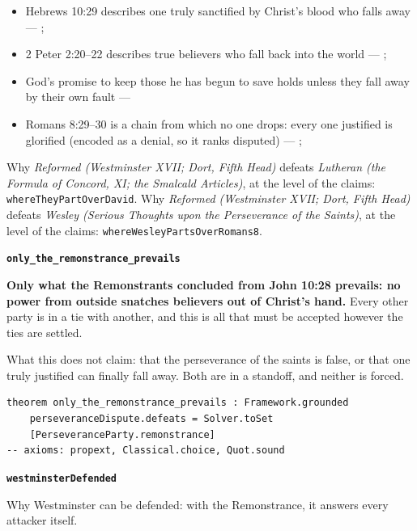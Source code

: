 \documentclass[11pt]{article}
\begin{document}
\begin{itemize}
\begin{itemize}
\item Hebrews 10:29 describes one truly sanctified by Christ’s blood who falls away --- \cite[448--449]{wesley-works-9-1827}; \cite[585]{wesley-explanatory-notes-nt}
\item 2 Peter 2:20–22 describes true believers who fall back into the world --- \cite[445--446]{wesley-works-9-1827}; \cite[625]{wesley-explanatory-notes-nt}
\item God’s promise to keep those he has begun to save holds unless they fall away by their own fault --- \cite[444--445]{wesley-works-9-1827}
\item Romans 8:29–30 is a chain from which no one drops: every one justified is glorified (encoded as a denial, so it ranks disputed) --- \cite[384]{wesley-explanatory-notes-nt}; \cite[413]{wesley-works-9-1827}
\end{itemize}
\end{itemize}
\noindent Why \emph{Reformed (Westminster XVII; Dort, Fifth Head)} defeats \emph{Lutheran (the Formula of Concord, XI; the Smalcald Articles)}, at the level of the claims: \texttt{where\allowbreak{}They\allowbreak{}Part\allowbreak{}Over\allowbreak{}David}.
\noindent Why \emph{Reformed (Westminster XVII; Dort, Fifth Head)} defeats \emph{Wesley (Serious Thoughts upon the Perseverance of the Saints)}, at the level of the claims: \texttt{where\allowbreak{}Wesley\allowbreak{}Parts\allowbreak{}Over\allowbreak{}Romans8}.
\par\medskip\noindent\textbf{\texttt{only\_\allowbreak{}the\_\allowbreak{}remonstrance\_\allowbreak{}prevails}}\par\nobreak\noindent
\textbf{Only what the Remonstrants concluded from John 10:28 prevails: no power from outside snatches believers out of Christ’s hand.} Every other party is in a tie with another, and this is all that must be accepted however the ties are settled.

What this does not claim: that the perseverance of the saints is false, or that one truly justified can finally fall away. Both are in a standoff, and neither is forced.

{\small\begin{verbatim}
theorem only_the_remonstrance_prevails : Framework.grounded
    perseveranceDispute.defeats = Solver.toSet
    [PerseveranceParty.remonstrance]
-- axioms: propext, Classical.choice, Quot.sound
\end{verbatim}}
\par\medskip\noindent\textbf{\texttt{westminster\allowbreak{}Defended}}\par\nobreak\noindent
Why Westminster can be defended: with the Remonstrance, it answers every attacker itself.
\end{document}

